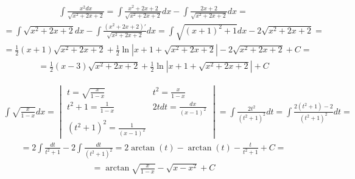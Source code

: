 
\begin{gather*}\int \frac{x^2dx}{\sqrt{x^2+2x+2}} = \int \frac{x^2+2x+2}{\sqrt{x^2+2x+2}}dx - \int \frac{2x+2}{\sqrt{x^2+2x+2}}dx = \end{gather*}
\begin{gather*}= \int \sqrt{x^2+2x+2}dx - \int \frac{(x^2+2x+2)'}{\sqrt{x^2+2x+2}}dx = \int \sqrt{(x+1)^2+1}dx - 2\sqrt{x^2+2x+2} = \end{gather*}
\begin{gather*}= \frac{1}{2}(x+1)\sqrt{x^2+2x+2} + \frac{1}{2}\ln|x+1+\sqrt{x^2+2x+2}|-2\sqrt{x^2+2x+2}+C = \end{gather*}
\begin{gather*}= \frac{1}{2}(x-3)\sqrt{x^2+2x+2} + \frac{1}{2}\ln|x+1+\sqrt{x^2+2x+2}|+C\end{gather*}



\begin{gather*}\int \sqrt{\frac{x}{1-x}}dx = \begin{vmatrix} t=\sqrt{\frac{x}{1-x}} & t^2=\frac{x}{1-x} \\ t^2+1=\frac{1}{1-x} & 2tdt = \frac{dx}{(x-1)^2} \\ (t^2+1)^2=\frac{1}{(x-1)^2} \end{vmatrix} = \int \frac{2t^2}{(t^2+1)^2}dt = \int \frac{2(t^2+1)-2}{(t^2+1)^2}dt = \end{gather*}
\begin{gather*}= 2\int \frac{dt}{t^2+1} - 2\int \frac{dt}{(t^2+1)^2} = 2\arctan (t) - \arctan (t) - \frac{t}{t^2+1} + C = \end{gather*}
\begin{gather*}= \arctan \sqrt{\frac{x}{1-x}} - \sqrt{x-x^2} +C\end{gather*}



